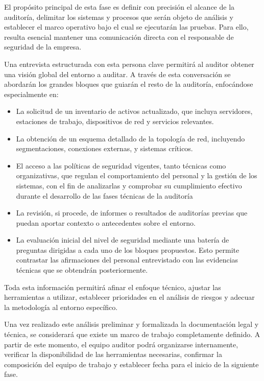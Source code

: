 \documentclass[a4paper, 10pt]{article}
\begin{document}
El propósito principal de esta fase es definir con precisión el alcance de la auditoría, delimitar los sistemas y procesos que serán objeto de análisis y establecer el marco operativo bajo el cual se ejecutarán las pruebas. Para ello, resulta esencial mantener una comunicación directa con el responsable de seguridad de la empresa.
\par\vspace{0.5cm}

Una entrevista estructurada con esta persona clave permitirá al auditor obtener una visión global del entorno a auditar. A través de esta conversación se abordarán los grandes bloques que guiarán el resto de la auditoría, enfocándose especialmente en:

\begin{itemize}
\item La solicitud de un inventario de activos actualizado, que incluya servidores, estaciones de trabajo, dispositivos de red y servicios relevantes.
\item La obtención de un esquema detallado de la topología de red, incluyendo segmentaciones, conexiones externas, y sistemas críticos.
\item El acceso a las políticas de seguridad vigentes, tanto técnicas como organizativas, que regulan el comportamiento del personal y la gestión de los sistemas, con el fin de analizarlas y comprobar su cumplimiento
efectivo durante el desarrollo de las fases técnicas de la auditoría
\item La revisión, si procede, de informes o resultados de auditorías previas que puedan aportar contexto o antecedentes sobre el entorno.
\item La evaluación inicial del nivel de seguridad mediante una batería de preguntas dirigidas a cada uno de los bloques propuestos. Esto permite contrastar las afirmaciones del personal entrevistado con las evidencias técnicas que se obtendrán posteriormente.
\end{itemize}

Toda esta información permitirá afinar el enfoque técnico, ajustar las herramientas a utilizar, establecer prioridades en el análisis de riesgos y adecuar la metodología al entorno específico.
\par\vspace{0.5cm}

Una vez realizado este análisis preliminar y formalizada la documentación legal y técnica, se considerará que existe un marco de trabajo completamente definido. A partir de este momento, el equipo auditor podrá organizarse internamente, verificar la disponibilidad de las herramientas necesarias, confirmar la composición del equipo de trabajo y establecer fecha para el inicio de la siguiente fase.
\par\vspace{0.5cm}
\end{document}
